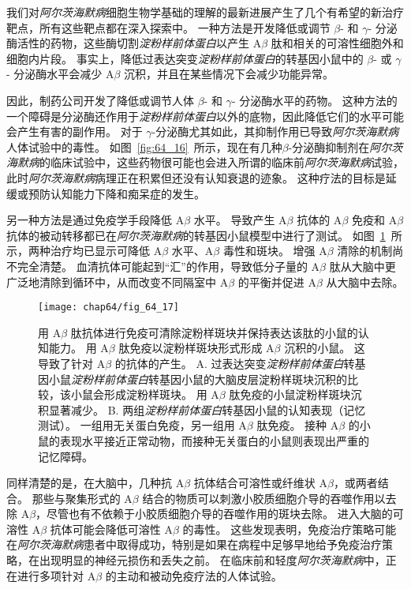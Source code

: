 我们对\textit{阿尔茨海默病}细胞生物学基础的理解的最新进展产生了几个有希望的新治疗靶点，所有这些靶点都在深入探索中。
一种方法是开发降低或调节 $\beta$- 和 $\gamma$- 分泌酶活性的药物，这些酶切割\textit{淀粉样前体蛋白}以产生 A$\beta$ 肽和相关的可溶性细胞外和细胞内片段。
事实上，降低过表达突变\textit{淀粉样前体蛋白}的转基因小鼠中的 $\beta$- 或 $\gamma$- 分泌酶水平会减少 A$\beta$ 沉积，并且在某些情况下会减少功能异常。


因此，制药公司开发了降低或调节人体 $\beta$- 和 $\gamma$- 分泌酶水平的药物。
这种方法的一个障碍是分泌酶还作用于\textit{淀粉样前体蛋白}以外的底物，因此降低它们的水平可能会产生有害的副作用。
对于 $\gamma$-分泌酶尤其如此，其抑制作用已导致\textit{阿尔茨海默病}人体试验中的毒性。
如图~\ref{fig:64_16}~所示，现在有几种$\beta$-分泌酶抑制剂在\textit{阿尔茨海默病}的临床试验中，这些药物很可能也会进入所谓的临床前\textit{阿尔茨海默病}试验，此时\textit{阿尔茨海默病}病理正在积累但还没有认知衰退的迹象。
这种疗法的目标是延缓或预防认知能力下降和痴呆症的发生。


另一种方法是通过免疫学手段降低 A$\beta$ 水平。
导致产生 A$\beta$ 抗体的 A$\beta$ 免疫和 A$\beta$ 抗体的被动转移都已在\textit{阿尔茨海默病}的转基因小鼠模型中进行了测试。
如图~\ref{fig:64_17}~所示，两种治疗均已显示可降低 A$\beta$ 水平、A$\beta$ 毒性和斑块。
增强 A$\beta$ 清除的机制尚不完全清楚。
血清抗体可能起到“汇”的作用，导致低分子量的 A$\beta$ 肽从大脑中更广泛地清除到循环中，从而改变不同隔室中 A$\beta$ 的平衡并促进 A$\beta$ 从大脑中去除。


\begin{figure}[htbp]
	\centering
	\texttt{[image: chap64/fig\_64\_17]}
	\caption{用 A$\beta$ 肽抗体进行免疫可清除淀粉样斑块并保持表达该肽的小鼠的认知能力。
		用 A$\beta$ 肽免疫以淀粉样斑块形式形成 A$\beta$ 沉积的小鼠。
		这导致了针对 A$\beta$ 的抗体的产生。
		A. 过表达突变\textit{淀粉样前体蛋白}转基因小鼠\textit{淀粉样前体蛋白}转基因小鼠的大脑皮层淀粉样斑块沉积的比较，该小鼠会形成淀粉样斑块。
		用 A$\beta$ 肽免疫的小鼠淀粉样斑块沉积显著减少\cite{brody2008active}。
		B. 两组\textit{淀粉样前体蛋白}转基因小鼠的认知表现（记忆测试）。
		一组用无关蛋白免疫，另一组用 A$\beta$ 肽免疫。
		接种 A$\beta$ 的小鼠的表现水平接近正常动物，而接种无关蛋白的小鼠则表现出严重的记忆障碍\cite{janus2000abeta}。}
	\label{fig:64_17}
\end{figure}


同样清楚的是，在大脑中，几种抗 A$\beta$ 抗体结合可溶性或纤维状 A$\beta$，或两者结合。
那些与聚集形式的 A$\beta$ 结合的物质可以刺激小胶质细胞介导的吞噬作用以去除 A$\beta$，尽管也有不依赖于小胶质细胞介导的吞噬作用的斑块去除。
进入大脑的可溶性 A$\beta$ 抗体可能会降低可溶性 A$\beta$ 的毒性。
这些发现表明，免疫治疗策略可能在\textit{阿尔茨海默病}患者中取得成功，特别是如果在病程中足够早地给予免疫治疗策略，在出现明显的神经元损伤和丢失之前。
在临床前和轻度\textit{阿尔茨海默病}中，正在进行多项针对 A$\beta$ 的主动和被动免疫疗法的人体试验。


